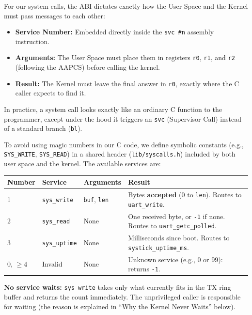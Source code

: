 For our system calls, the ABI dictates exactly how the User Space and the Kernel must pass messages to each other:
\begin{itemize}
    \item \textbf{Service Number:} Embedded directly inside the \texttt{svc \#n} assembly instruction.
    \item \textbf{Arguments:} The User Space must place them in registers \texttt{r0}, \texttt{r1}, and \texttt{r2} (following the AAPCS) before calling the kernel.
    \item \textbf{Result:} The Kernel must leave the final answer in \texttt{r0}, exactly where the C caller expects to find it.
\end{itemize}

In practice, a system call looks exactly like an ordinary C function to the programmer, except under the hood it triggers an \texttt{svc} (Supervisor Call) instead of a standard branch (\texttt{bl}).

To avoid using magic numbers in our C code, we define symbolic constants (e.g., \texttt{SYS\_WRITE}, \texttt{SYS\_READ}) in a shared header (\texttt{lib/syscalls.h}) included by both user space and the kernel. The available services are:

\begin{table}[h!]
    \centering
    \small
    \begin{tabular}{lllp{6.5cm}}
        \toprule
        \textbf{Number} & \textbf{Service} & \textbf{Arguments} & \textbf{Result} \\
        \midrule
        1 & \texttt{sys\_write} & \texttt{buf}, \texttt{len} & Bytes \textbf{accepted} (0 to \texttt{len}). Routes to \texttt{uart\_write}. \\
        2 & \texttt{sys\_read} & None & One received byte, or \texttt{-1} if none. Routes to \texttt{uart\_getc\_polled}. \\
        3 & \texttt{sys\_uptime} & None & Milliseconds since boot. Routes to \texttt{systick\_uptime\_ms}. \\
        0, $\ge 4$ & Invalid & None & Unknown service (e.g., 0 or 99): returns \texttt{-1}. \\
        \bottomrule
    \end{tabular}
\end{table}

\textbf{No service waits:} \texttt{sys\_write} takes only what currently fits in the TX ring buffer and returns the count immediately. The unprivileged caller is responsible for waiting (the reason is explained in ``Why the Kernel Never Waits'' below).

